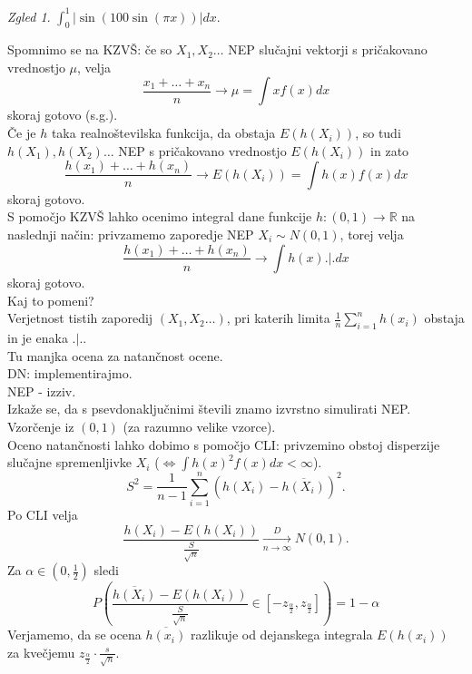 \documentclass[a4paper, 12pt]{book}
\theoremstyle{definition}
\theoremstyle{remark}
\newtheorem*{exmp}{Zgled}
\newcommand{\R}{\mathbb{R}}
\begin{document}
\begin{exmp}
   $\int_{0}^{1} \left| \sin(100 \sin(\pi x))\right| dx$.
\end{exmp}
Spomnimo se na KZVŠ: če so $X_1, X_2 \dots$ NEP slučajni vektorji s pričakovano vrednostjo $\mu$, velja
\begin{equation*}
  \frac{x_1 + \dots + x_n}{n} \to \mu = \int x f(x) dx
\end{equation*}
skoraj gotovo (s.g.). \\
Če je $h$ taka realnoštevilska funkcija, da obstaja $E(h(X_i))$,
so tudi $h(X_1), h(X_2) \dots$ NEP s pričakovano vrednostjo $E(h(X_i))$ in zato
\begin{equation*}
  \frac{h(x_1) + \dots + h(x_n)}{n} \to E(h(X_i)) = \int h(x) f(x) dx
\end{equation*}
skoraj gotovo. \\
S pomočjo KZVŠ lahko ocenimo integral dane funkcije $h: (0,1) \to \R$ na naslednji način:
privzamemo zaporedje NEP $X_i \sim N(0,1)$, torej velja
\begin{equation*}
  \frac{h(x_1) + \dots + h(x_n)}{n} \to \int h(x) .|. dx
\end{equation*}
skoraj gotovo. \\
Kaj to pomeni? \\
Verjetnost tistih zaporedij $(X_1, X_2 \dots)$,
pri katerih limita $\frac{1}{n} \sum_{i=1}^{n} h(x_i)$ obstaja in je enaka $.|.$. \\
Tu manjka ocena za natančnost ocene. \\
DN: implementirajmo. \\
NEP - izziv. \\
Izkaže se, da s psevdonaključnimi števili znamo izvrstno simulirati NEP.
Vzorčenje iz $(0,1)$ (za razumno velike vzorce). \\
Oceno natančnosti lahko dobimo s pomočjo CLI: privzemino obstoj disperzije slučajne spremenljivke $X_i$
($\iff \int h(x)^2 f(x) dx < \infty$).
\begin{equation*}
  S^2 = \frac{1}{n-1} \sum_{i=1}^{n} (h(X_i) - \overline{h(X_i)})^2.
\end{equation*}
Po CLI velja
\begin{equation*}
  \frac{h(X_i) - E(h(X_i))}{\frac{S}{\sqrt{n}}} \xrightarrow[n \to \infty]{D} N(0,1).
\end{equation*}
Za $\alpha \in (0, \frac{1}{2})$ sledi
\begin{equation*}
  P\left(\frac{\overline{h(X_i)} - E(h(X_i))}{\frac{S}{\sqrt{n}}} \in [-z_{\frac{\alpha}{2}}, z_{\frac{\alpha}{2}}]\right) = 1 - \alpha%
\end{equation*}
Verjamemo, da se ocena $\overline{h(x_i)}$ razlikuje od dejanskega integrala $E(h(x_i))$ za kvečjemu
$z_{\frac{\alpha}{2}} \cdot \frac{s}{\sqrt{n}}$.



%
%



\end{document}
